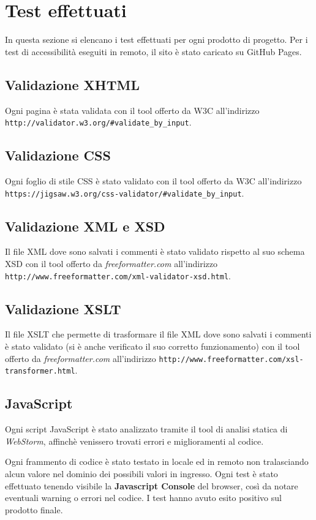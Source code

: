 \section{Test effettuati} %
In questa sezione si elencano i test effettuati per ogni prodotto di progetto.
Per i test di accessibilità eseguiti in remoto, il sito è stato caricato su
GitHub Pages.

\subsection{Validazione XHTML}
Ogni pagina è stata validata con il tool offerto da W3C all'indirizzo
\texttt{http://validator.w3.org/\#validate\_by\_input}.

\subsection{Validazione CSS}
Ogni foglio di stile CSS è stato validato con il tool offerto da W3C
all'indirizzo
\texttt{https://jigsaw.w3.org/css-validator/\#validate\_by\_input}.

\subsection{Validazione XML e XSD}
Il file XML dove sono salvati i commenti è stato validato rispetto al suo
schema XSD con il tool offerto da \textit{freeformatter.com} all'indirizzo
\texttt{http://www.freeformatter.com/xml-validator-xsd.html}.

\subsection{Validazione XSLT}
Il file XSLT che permette di trasformare il file XML dove sono salvati i
commenti è stato validato (si è anche verificato il suo corretto
funzionamento) con il tool offerto da \textit{freeformatter.com} all'indirizzo
\texttt{http://www.freeformatter.com/xsl-transformer.html}.

\subsection{JavaScript}
Ogni script JavaScript è stato analizzato tramite il tool di analisi statica di
\textit{WebStorm}, affinchè venissero trovati errori e miglioramenti al codice.

Ogni frammento di codice è stato testato in locale ed in remoto non tralasciando alcun valore nel dominio dei possibili valori in ingresso. Ogni
test è stato effettuato tenendo visibile la \textbf{Javascript Console} del
browser, così da notare eventuali warning o errori nel codice. I test hanno
avuto esito positivo sul prodotto finale.

